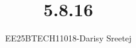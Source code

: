 \documentclass[journal]{IEEEtran}
\begin{document}

\vspace{3cm}

\title{5.8.16}
\author{EE25BTECH11018-Darisy Sreetej}
 \maketitle
{\let\newpage\relax\maketitle}

\renewcommand{\thefigure}{\theenumi}
\renewcommand{\thetable}{\theenumi}
\setlength{\intextsep}{10pt} %


\renewcommand{\thetable}{\theenumi}
\end{document}
